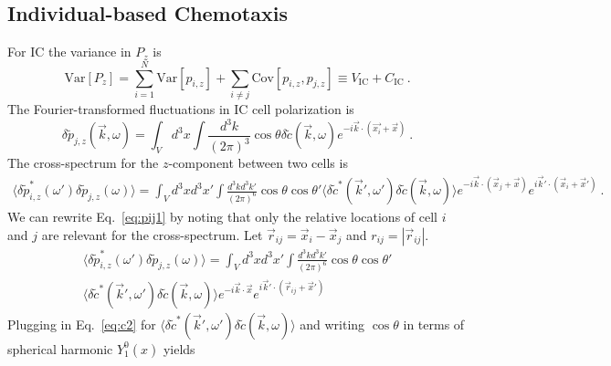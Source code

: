\subsection{Individual-based Chemotaxis}
For IC the variance in $P_z$ is
\begin{equation}
    \text{Var}[P_z] = \sum_{i=1}^N \text{Var}[p_{i,z}] + \sum_{i\neq j} \text{Cov}[p_{i,z},p_{j,z}] \equiv V_\text{IC} + C_\text{IC} \ .
\end{equation}
The Fourier-transformed fluctuations in IC cell polarization is
\begin{equation}
    \delta\tilde{p}_{j,z}(\vec{k},\omega) = \int_V d^3x \int \frac{d^3k}{(2\pi)^3} \cos\theta
    \delta\tilde{c}(\vec{k},\omega)
    e^{-i\vec{k}\cdot(\vec{x_i}+\vec{x})} \ .
\end{equation}
The cross-spectrum for the $z$-component between two cells is
\begin{equation} \label{eq:pij1}
\begin{split}
    \langle\delta\tilde{p}_{i,z}^*(\omega')\delta\tilde{p}_{j,z}(\omega) \rangle = \int_V d^3x d^3x' \int \frac{d^3kd^3k'}{(2\pi)^6}
    \cos\theta \cos\theta'
    \langle \delta\tilde{c}^*(\vec{k}',\omega')\delta\tilde{c}(\vec{k},\omega) \rangle
    e^{-i\vec{k}\cdot(\vec{x}_j+\vec{x})} e^{i\vec{k}'\cdot(\vec{x}_i+\vec{x}')} \ .
\end{split}
\end{equation}
We can rewrite Eq.\ \ref{eq:pij1} by noting that only the relative locations of cell $i$ and $j$ are relevant for the cross-spectrum. Let $\vec{r}_{ij} = \vec{x}_i - \vec{x}_j$ and $r_{ij} = |\vec{r}_{ij}|$.
\begin{equation} \label{eq:sij2}
\begin{split}
    \langle \delta\tilde{p}_{i,z}^*(\omega')\delta\tilde{p}_{j,z}(\omega) \rangle = \int_V d^3x d^3x' \int \frac{d^3kd^3k'}{(2\pi)^6}
    \cos\theta \cos\theta' \\
    \langle \delta\tilde{c}^*(\vec{k}',\omega') \delta\tilde{c}(\vec{k},\omega) \rangle
    e^{-i\vec{k}\cdot\vec{x}} e^{i\vec{k}'\cdot(\vec{r}_{ij}+\vec{x}')}
\end{split}
\end{equation}
Plugging in Eq.\ \ref{eq:c2} for
$\langle \delta\tilde{c}^*(\vec{k}',\omega') \delta\tilde{c}(\vec{k},\omega) \rangle$
and writing $\cos\theta$ in terms of spherical harmonic $Y_1^0(\hat{x})$ yields
